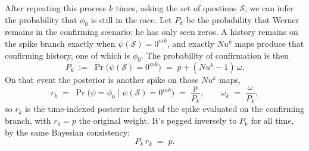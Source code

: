 \documentclass[11pt]{article}
\begin{document}
After repeating this process $k$ times, asking the set of questions $\mathcal{S}$, we can infer the probability that $\phi_0$ is still in the race. 
Let $P_k$ be the probability that Werner remains in the confirming scenario: he has only seen zeros.
A history remains on the spike branch exactly
when $\psi(\mathcal S) = 0^{mk}$, and exactly $N u^k$ maps
produce that confirming history, one of which is $\phi_0$. The probability of confirmation is then
%
\begin{equation}
  P_k \;:=\; \Pr\big(\psi(\mathcal S) = 0^{mk}\big)
  \;=\; p + (N u^k - 1)\,\omega .
  \label{eq:spikePk}
\end{equation}
%
On that event the posterior is another spike on those $N u^k$ maps,
%
\begin{equation}
  r_k \;=\; \Pr\big(\psi = \phi_0 \mid
  \psi(\mathcal S) = 0^{mk}\big) \;=\; \frac{p}{P_k},
  \qquad
  \omega_k \;=\; \frac{\omega}{P_k},
  \label{eq:spikeposterior}
\end{equation}
%
so $r_k$ is the time-indexed posterior height of the spike evaluated
on the confirming branch, with $r_0 = p$ the original
weight. It's pegged inversely to $P_k$ for all time, by the same Bayesian consistency:
%
\begin{equation}
  P_k\, r_k \;=\; p.
  \label{eq:spikeinvariant}
\end{equation}
%
\end{document}
